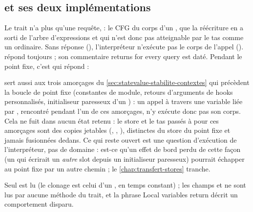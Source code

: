 \subsection{ et ses deux implémentations}


Le trait n'a plus qu'une requête,  : le CFG du corps
d'un , que la réécriture en  a
sorti de l'arbre d'expressions et qui n'est donc pas atteignable par le tas
comme un  ordinaire. Sans réponse (), l'interpréteur
n'exécute pas le corps de l'appel
().  répond
toujours  ; son commentaire \og returns  for every
query\fg{} est daté. Pendant le point fixe, c'est  qui
répond :


\begin{piege}
   sert aussi aux trois amorçages du
  \cref{sec:statevalue-stabilite-contextes} qui précèdent la boucle de point
  fixe (constantes de module, retours d'arguments de hooks personnalisés,
  initialiseur paresseux d'un ) : un appel à travers une
  variable liée par , rencontré pendant l'un de ces
  amorçages, n'y exécute donc pas son corps. Cela ne fuit dans aucun état
  retenu : le store et le tas passés à  pour ces
  amorçages sont des copies jetables (,
  , ),
  distinctes du store du point fixe et jamais fusionnées dedans. Ce qui reste
  ouvert est une question d'exécution de l'interpréteur, pas de domaine :
  est-ce qu'un effet de bord perdu de cette façon (un  qui
  écrirait un \emph{autre} slot depuis un initialiseur paresseux) pourrait
  échapper au point fixe par un autre chemin ; le \cref{chap:transfert-stores}
  tranche.
\end{piege}

Seul  est lu (le clonage est celui d'un , en temps
constant) ; les champs  et  ne sont lus par aucune
méthode du trait, et la phrase \og Local variables return \fg{}
décrit un comportement disparu.

